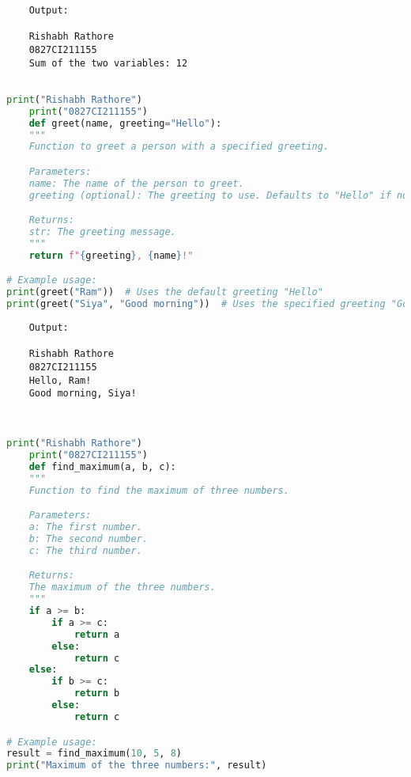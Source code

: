 \documentclass{report}
\begin{document}
\begin{verbatim}
	Output:

	Rishabh Rathore
	0827CI211155
	Sum of the two variables: 12


\end{verbatim}

\newpage


\sol 
\begin{lstlisting}[language=Python]
	print("Rishabh Rathore")
	print("0827CI211155")
	def greet(name, greeting="Hello"):
    """
    Function to greet a person with a specified greeting.

    Parameters:
    name: The name of the person to greet.
    greeting (optional): The greeting to use. Defaults to "Hello" if not specified.

    Returns:
    str: The greeting message.
    """
    return f"{greeting}, {name}!"

# Example usage:
print(greet("Ram"))  # Uses the default greeting "Hello"
print(greet("Siya", "Good morning"))  # Uses the specified greeting "Good morning"


\end{lstlisting}

\begin{verbatim}
	Output:

	Rishabh Rathore
	0827CI211155
	Hello, Ram!
	Good morning, Siya!
	
	
\end{verbatim}

\newpage


\sol 
\begin{lstlisting}[language=Python]
	print("Rishabh Rathore")
	print("0827CI211155")
	def find_maximum(a, b, c):
    """
    Function to find the maximum of three numbers.

    Parameters:
    a: The first number.
    b: The second number.
    c: The third number.

    Returns:
    The maximum of the three numbers.
    """
    if a >= b:
        if a >= c:
            return a
        else:
            return c
    else:
        if b >= c:
            return b
        else:
            return c

# Example usage:
result = find_maximum(10, 5, 8)
print("Maximum of the three numbers:", result)
  

\end{lstlisting}
\end{document}
